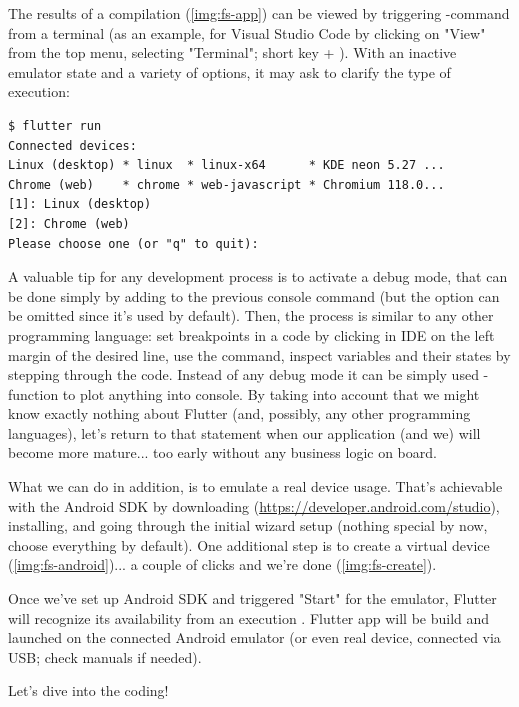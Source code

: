 \noindent The results of a compilation (\cref{img:fs-app}) can be viewed by triggering -command from a
terminal (as an example, for Visual Studio Code by clicking on "View" from the top menu, selecting "Terminal"; short
key  + ). With an inactive emulator state and a variety of options, it may ask to clarify
the type of execution:

\begin{lstlisting}[language=terminal]
$ flutter run
Connected devices:
Linux (desktop) * linux  * linux-x64      * KDE neon 5.27 ...
Chrome (web)    * chrome * web-javascript * Chromium 118.0...
[1]: Linux (desktop)
[2]: Chrome (web)
Please choose one (or "q" to quit):
\end{lstlisting}


\noindent A valuable tip for any development process is to activate a debug mode, that can be done simply by adding
 to the previous console command (but the option can be omitted since it's used by default). Then,
the process is similar to any other programming language: set breakpoints in a code by clicking in IDE on the left
margin of the desired line, use the command, inspect variables and their states by stepping through the code. Instead
of any debug mode it can be simply used -function to plot anything into console. By taking into account that
we might know exactly nothing about Flutter (and, possibly, any other programming languages), let's return to that
statement when our application (and we) will become more mature... too early without any business logic on board.

What we can do in addition, is to emulate a real device usage. That's achievable with the Android SDK by downloading
(\href{https://developer.android.com/studio}{https://developer.android.com/studio}), installing, and going through
the initial wizard setup (nothing special by now, choose everything by default). One additional step is to create a
virtual device (\cref{img:fs-android})... a couple of clicks and we're done (\cref{img:fs-create}).

Once we've set up Android SDK and triggered "Start" for the emulator, Flutter will recognize its availability from
an execution . Flutter app will be build and launched on the connected Android emulator (or even real
device, connected via USB; check manuals if needed).\\


\noindent Let's dive into the coding!
